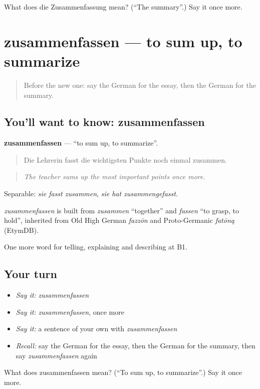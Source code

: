 \begin{tcolorbox}[breakable,colback=teal!4,colframe=teal!35!black,title={Before you move on}]
What does die Zusammenfassung mean? (\textquotedblleft{}The summary\textquotedblright{}.) Say it once more.
\end{tcolorbox}
\section[zusammenfassen]{zusammenfassen — to sum up, to summarize}

\label{lesson:GE-C378-zusammenfassen}



\begin{quote}
Before the new one: say the German for the essay, then the German for the summary.
\end{quote}

\subsection*{You'll want to know: zusammenfassen}
\textbf{zusammenfassen} — \textquotedblleft{}to sum up, to summarize\textquotedblright{}.

\begin{quote}
Die Lehrerin fasst die wichtigsten Punkte noch einmal zusammen.
\end{quote}

\begin{quote}
\emph{The teacher sums up the most important points once more.}
\end{quote}

Separable: \emph{sie fasst zusammen}, \emph{sie hat zusammengefasst}.

\begin{cousinweb}
\emph{zusammenfassen} is built from \emph{zusammen} \textquotedblleft{}together\textquotedblright{} and \emph{fassen} \textquotedblleft{}to grasp, to hold\textquotedblright{}, inherited from Old High German \emph{fazzōn} and Proto-Germanic \emph{fatōną} (EtymDB).
\end{cousinweb}

\begin{grammarlens}[title={What you've built}]
One more word for telling, explaining and describing at B1.
\end{grammarlens}

\subsection*{Your turn}
\begin{itemize}
\raggedright
  \item \emph{Say it:} \emph{zusammenfassen}
  \item \emph{Say it:} \emph{zusammenfassen}, once more
  \item \emph{Say it:} a sentence of your own with \emph{zusammenfassen}
  \item \emph{Recall:} say the German for the essay, then the German for the summary, then say \emph{zusammenfassen} again
\end{itemize}

\begin{tcolorbox}[breakable,colback=teal!4,colframe=teal!35!black,title={Before you move on}]
What does zusammenfassen mean? (\textquotedblleft{}To sum up, to summarize\textquotedblright{}.) Say it once more.
\end{tcolorbox}
